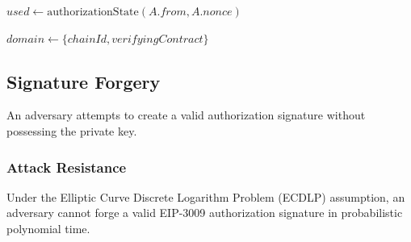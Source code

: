 \begin{algorithm}[H]
\caption{Replay Protection Verification}
\label{alg:replay-protection}

\BlankLine
{}

\BlankLine
{}
$used \gets \text{authorizationState}(A.from, A.nonce)$\;

\BlankLine
{}
$domain \gets \{chainId, verifyingContract\}$\;

 
\end{algorithm}

\subsection{Signature Forgery}

\begin{securitybox}
An adversary attempts to create a valid authorization signature without possessing the private key.
\end{securitybox}

\subsubsection{Attack Resistance}

\begin{theorem}
Under the Elliptic Curve Discrete Logarithm Problem (ECDLP) assumption, an adversary cannot forge a valid EIP-3009 authorization signature in probabilistic polynomial time.
\end{theorem}


